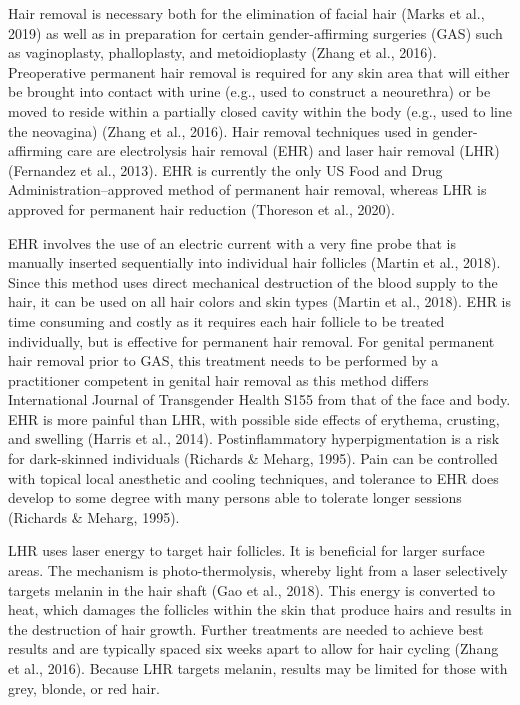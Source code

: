 \documentclass[
]{book}
\begin{document}
Hair removal is necessary both for the elimination of facial hair (Marks et al., 2019) as well
as in preparation for certain gender-affirming
surgeries (GAS) such as vaginoplasty, phalloplasty,
and metoidioplasty (Zhang et al., 2016).
Preoperative permanent hair removal is required
for any skin area that will either be brought into
contact with urine (e.g., used to construct a neourethra) or be moved to reside within a partially
closed cavity within the body (e.g., used to line
the neovagina) (Zhang et al., 2016). Hair removal
techniques used in gender-affirming care are electrolysis hair removal (EHR) and laser hair
removal (LHR) (Fernandez et al., 2013). EHR is
currently the only US Food and Drug
Administration--approved method of permanent
hair removal, whereas LHR is approved for permanent hair reduction (Thoreson et al., 2020).

EHR involves the use of an electric current
with a very fine probe that is manually inserted
sequentially into individual hair follicles (Martin
et al., 2018). Since this method uses direct
mechanical destruction of the blood supply to
the hair, it can be used on all hair colors and
skin types (Martin et al., 2018). EHR is time
consuming and costly as it requires each hair
follicle to be treated individually, but is effective
for permanent hair removal. For genital permanent hair removal prior to GAS, this treatment
needs to be performed by a practitioner competent in genital hair removal as this method differs
International Journal of Transgender Health S155
from that of the face and body. EHR is more
painful than LHR, with possible side effects of
erythema, crusting, and swelling (Harris et al.,
2014). Postinflammatory hyperpigmentation is a
risk for dark-skinned individuals (Richards \&
Meharg, 1995). Pain can be controlled with topical local anesthetic and cooling techniques, and
tolerance to EHR does develop to some degree
with many persons able to tolerate longer sessions
(Richards \& Meharg, 1995).

LHR uses laser energy to target hair follicles. It
is beneficial for larger surface areas. The mechanism is photo-thermolysis, whereby light from a
laser selectively targets melanin in the hair shaft
(Gao et al., 2018). This energy is converted to
heat, which damages the follicles within the skin
that produce hairs and results in the destruction
of hair growth. Further treatments are needed to
achieve best results and are typically spaced six
weeks apart to allow for hair cycling (Zhang et al.,
2016). Because LHR targets melanin, results may
be limited for those with grey, blonde, or red hair.
\end{document}
